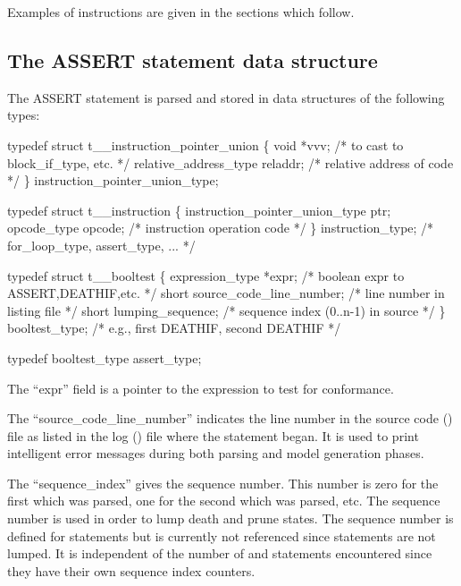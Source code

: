 Examples of instructions are given in the sections which follow.

\subsection{The ASSERT statement data structure}
\label{sec:assert}

The ASSERT statement is parsed
and stored in data structures of the following types:
\begin{codeexample}
typedef struct t__instruction_pointer_union
   \{
       void *vvv;                      /* to cast to block_if_type, etc. */
       relative_address_type reladdr;  /* relative address of code */
   \} instruction_pointer_union_type;
\end{codeexample}

\begin{codeexample}
typedef struct t__instruction
   \{
       instruction_pointer_union_type ptr;
       opcode_type opcode;      /* instruction operation code */
   \} instruction_type;          /*    for_loop_type, assert_type, ... */
\end{codeexample}

\begin{codeexample}
typedef struct t__booltest
   \{
       expression_type *expr;         /* boolean expr to ASSERT,DEATHIF,etc. */
       short source_code_line_number; /* line number in listing file */
       short lumping_sequence;        /* sequence index (0..n-1) in source */
   \} booltest_type;                   /* e.g., first DEATHIF, second DEATHIF */
\end{codeexample}

\begin{codeexample}
typedef booltest_type assert_type;
\end{codeexample}


The ``expr'' field is a pointer to the expression to test for conformance.

The ``source\_code\_line\_number'' indicates the line number in the source
code () file as listed in the log () file
where the statement began.   It is used to print intelligent
error messages during both parsing and model generation phases.

The ``sequence\_index'' gives the  sequence number.   This number
is zero for the first  which was parsed, one for the second
 which was parsed, etc.   The sequence number is used in order
to lump death and prune states.   The sequence number is defined
for  statements but is currently not referenced since 
statements are not lumped.  It is independent of the number of 
and  statements encountered since they have their own sequence
index counters.

